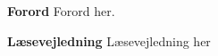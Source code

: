 {\Huge\textbf{Forord}}\newline
Forord her.\newline

{\Huge\textbf{Læsevejledning}}\newline
Læsevejledning her\newline